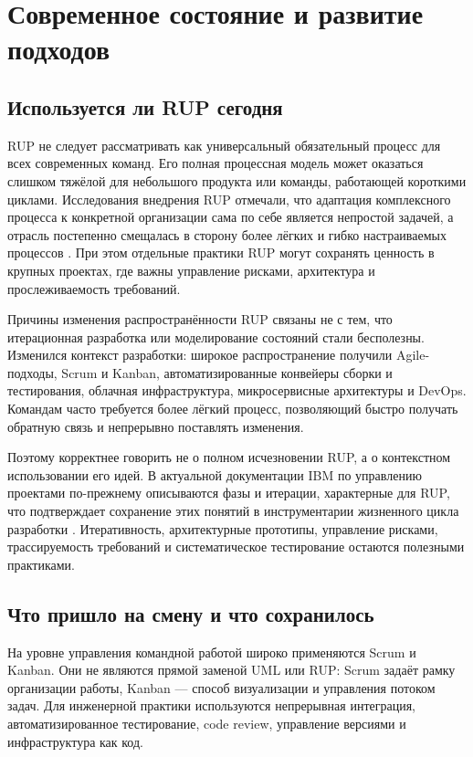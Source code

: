 \documentclass[essay,paper]{pmk-graduate}
\begin{document}
\section{Современное состояние и развитие подходов}

\subsection{Используется ли RUP сегодня}

RUP не следует рассматривать как универсальный обязательный процесс для всех современных команд. Его полная процессная модель может оказаться слишком тяжёлой для небольшого продукта или команды, работающей короткими циклами. Исследования внедрения RUP отмечали, что адаптация комплексного процесса к конкретной организации сама по себе является непростой задачей, а отрасль постепенно смещалась в сторону более лёгких и гибко настраиваемых процессов \cite{hanssen2007}. При этом отдельные практики RUP могут сохранять ценность в крупных проектах, где важны управление рисками, архитектура и прослеживаемость требований.

Причины изменения распространённости RUP связаны не с тем, что итерационная разработка или моделирование состояний стали бесполезны. Изменился контекст разработки: широкое распространение получили Agile-подходы, Scrum и Kanban, автоматизированные конвейеры сборки и тестирования, облачная инфраструктура, микросервисные архитектуры и DevOps. Командам часто требуется более лёгкий процесс, позволяющий быстро получать обратную связь и непрерывно поставлять изменения.

Поэтому корректнее говорить не о полном исчезновении RUP, а о контекстном использовании его идей. В актуальной документации IBM по управлению проектами по-прежнему описываются фазы и итерации, характерные для RUP, что подтверждает сохранение этих понятий в инструментарии жизненного цикла разработки \cite{ibmphase}. Итеративность, архитектурные прототипы, управление рисками, трассируемость требований и систематическое тестирование остаются полезными практиками.

\subsection{Что пришло на смену и что сохранилось}

На уровне управления командной работой широко применяются Scrum и Kanban. Они не являются прямой заменой UML или RUP: Scrum задаёт рамку организации работы, Kanban — способ визуализации и управления потоком задач. Для инженерной практики используются непрерывная интеграция, автоматизированное тестирование, code review, управление версиями и инфраструктура как код.
\end{document}
